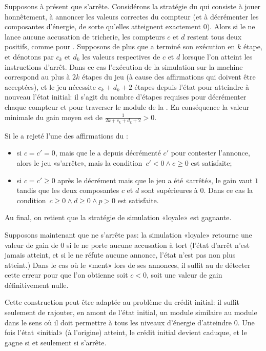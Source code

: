 Supposons à présent que \machine s'arrête.
Considérons la stratégie du \jo qui consiste à jouer honnêtement, \cad à annoncer les valeurs correctes du compteur (et à décrémenter les composantes d'énergie, de sorte qu'elles atteignent exactement $0$).
Alors si le \ji ne lance aucune accusation de tricherie, les compteurs $c$ et $d$ restent tous deux positifs, comme pour \machine.
Supposons de plus que \machine a terminé son exécution en $k$ étape, et dénotons par $c_k$ et $d_k$ les valeurs respectives de $c$ et $d$ lorsque l'on atteint les instructions d'arrêt.
Dans ce cas l'exécution de la simulation sur la machine correspond au plus à $2k$ étapes du jeu (à cause des affirmations qui doivent être acceptées), et le jeu nécessite $c_k+d_k+2$ étapes depuis l'état \tjhalt pour atteindre à nouveau l'état initial: il s'agit du nombre d'étapes requises pour décrémenter chaque compteur et pour traverser le module de la .
En conséquence la valeur minimale du gain moyen est de $\frac1{2k+c_k+d_k+2}>0$.

Si le \ji a rejeté l'une des affirmations du \jo:
\begin{itemize}
\item si $c=c'=0$, mais que le \ji a depuis décrémenté $c'$ pour contester l'annonce, alors le jeu «s'arrête», mais la condition~$c'<0 \wedge c\geq0$ est satisfaite;
\item si $c=c'\geq0$ après le décrément mais que le jeu a été «arrêté», le gain vaut $1$ tandis que les deux composantes $c$ et $d$ sont supérieures à $0$. Dans ce cas la condition~$c\geq0 \wedge d\geq0 \wedge p>0$ est satisfaite.
\end{itemize}

Au final, on retient que la stratégie de simulation «loyale» est gagnante.

\bigskip

Supposons maintenant que \machine ne s'arrête pas: la simulation «loyale» retourne une valeur de gain de $0$ si le \ji ne porte aucune accusation à tort (l'état d'arrêt \tjhalt n'est jamais atteint, et si le \ji ne réfute aucune annonce, l'état \tjstopq n'est pas non plus atteint.)
Dans le cas où le \jo «ment» lors de ses annonces, il suffit au \ji de détecter cette erreur pour que l'on obtienne soit $c<0$, soit une valeur de gain définitivement nulle.

\bigskip

Cette construction peut être adaptée au problème du crédit initial: il suffit seulement de rajouter, en amont de l'état initial, un module similaire au module \tjhalt dans le sens où il doit permettre à tous les niveaux d'énergie d'atteindre $0$.
Une fois l'état «initial» (à l'origine) atteint, le crédit initial devient caduque, et le \jo gagne si et seulement si \machine s'arrête.


